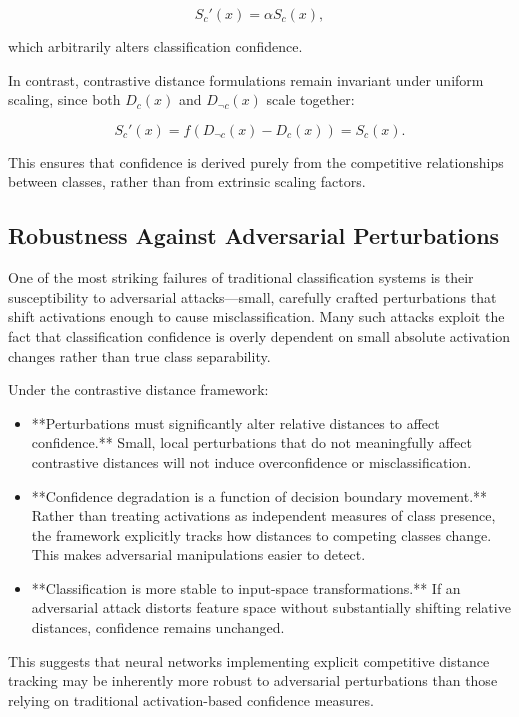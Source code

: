\[
S_c'(x) = \alpha S_c(x),
\]

which arbitrarily alters classification confidence.

In contrast, contrastive distance formulations remain invariant under uniform scaling, since both \( D_c(x) \) and \( D_{\neg c}(x) \) scale together:

\[
S_c'(x) = f(D_{\neg c}(x) - D_c(x)) = S_c(x).
\]

This ensures that confidence is derived purely from the competitive relationships between classes, rather than from extrinsic scaling factors.

\subsection{Robustness Against Adversarial Perturbations}

One of the most striking failures of traditional classification systems is their susceptibility to adversarial attacks—small, carefully crafted perturbations that shift activations enough to cause misclassification. Many such attacks exploit the fact that classification confidence is overly dependent on small absolute activation changes rather than true class separability.

Under the contrastive distance framework:

\begin{itemize}
    \item **Perturbations must significantly alter relative distances to affect confidence.** Small, local perturbations that do not meaningfully affect contrastive distances will not induce overconfidence or misclassification.
    \item **Confidence degradation is a function of decision boundary movement.** Rather than treating activations as independent measures of class presence, the framework explicitly tracks how distances to competing classes change. This makes adversarial manipulations easier to detect.
    \item **Classification is more stable to input-space transformations.** If an adversarial attack distorts feature space without substantially shifting relative distances, confidence remains unchanged.
\end{itemize}

This suggests that neural networks implementing explicit competitive distance tracking may be inherently more robust to adversarial perturbations than those relying on traditional activation-based confidence measures.

